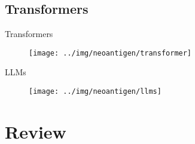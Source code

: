 \documentclass[10pt]{beamer}
\newcommand{\1}{
	\setbeamertemplate{background}{
		\texttt{[image: ../img/1]}
		\tikz[overlay] \fill[fill opacity=0.75,fill=white] (0,0) rectangle (-\paperwidth,\paperheight);
	}
}
\begin{document}
\subsection{Transformers}


\begin{frame}{Transformers}{}	
	\begin{figure}
		\texttt{[image: ../img/neoantigen/transformer]}
	\end{figure}		
\end{frame}

\begin{frame}{LLMs}{}	
	\begin{figure}
		\texttt{[image: ../img/neoantigen/llms]}
	\end{figure}		
\end{frame}

\section{Review}
\end{document}
